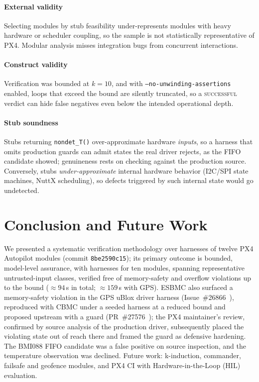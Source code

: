 \documentclass[conference]{IEEEtran}
\newcommand{\entra}[1]{#1}
\newcommand{\corr}[1]{#1}
\begin{document}
\paragraph{External validity}
Selecting modules by stub feasibility under-represents modules with
heavy hardware or scheduler coupling, so the sample is not
statistically representative of PX4. Modular analysis misses
integration bugs from concurrent interactions.

\paragraph{Construct validity}
Verification was bounded at $k=10$, and with
\texttt{--no-unwinding-assertions} enabled, loops that exceed the
bound are silently truncated, so a \textsc{successful} verdict can
hide false negatives even below the intended operational
depth.

\paragraph{Stub soundness}
Stubs returning \texttt{nondet\_T()} over-approximate hardware
\emph{inputs}, so a harness that omits production guards can admit
states the real driver rejects, as the FIFO candidate showed;
genuineness rests on checking against the production source. Conversely, stubs
\emph{under-approximate} internal hardware behavior (I2C/SPI state
machines, NuttX scheduling), so defects triggered by such internal
state would go undetected.

\section{Conclusion and Future Work}
\label{sec:conclusion}

We presented a systematic verification methodology over harnesses of twelve PX4
Autopilot modules (commit \texttt{8be2590c15}); its primary outcome is bounded, model-level
assurance, with harnesses for ten modules, spanning representative untrusted-input
classes, verified free of memory-safety and overflow violations up to
the bound (${\approx}94$\,s in total; ${\approx}159$\,s with GPS). ESBMC also surfaced a
memory-safety violation in the GPS uBlox driver harness
\entra{(Issue~\#26866~\cite{PX4_Issue26866}), \corr{reproduced with CBMC under a seeded harness at a reduced bound} and proposed upstream
with a guard (PR~\#27576~\cite{PX4_PR27576}); the PX4 maintainer's review, confirmed by source analysis of the production
driver, subsequently placed the violating state out of reach there and framed the guard as defensive hardening.}
\entra{The} BMI088 FIFO candidate was a false positive on
source inspection, and the temperature observation was declined.
Future work: k-induction, commander, failsafe and geofence modules,
and PX4 CI with Hardware-in-the-Loop (HIL) evaluation.
\end{document}
